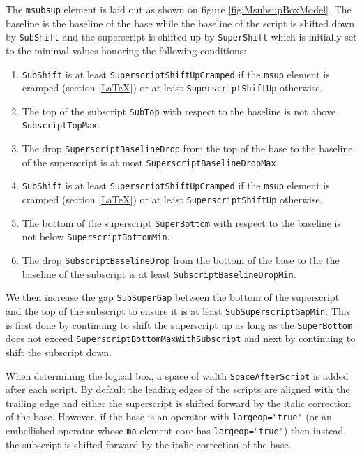 The {\tt msubsup} element is laid out as shown on figure
\ref{fig:MsubsupBoxModel}.
The baseline is the baseline of the base while the baseline of the script is
shifted down by {\tt SubShift} and the superscript is shifted up by
{\tt SuperShift} which is initially set to the minimal values honoring the
following conditions:
\begin{enumerate}
\item {\tt SubShift} is at least
  {\tt SuperscriptShiftUpCramped} if the {\tt msup} element is
  cramped (section \ref{LaTeX}) or at least
  {\tt SuperscriptShiftUp} otherwise.
\item The top of the subscript {\tt SubTop} with respect to the baseline
  is not above {\tt SubscriptTopMax}.
\item The drop {\tt SuperscriptBaselineDrop} from the top of the base to
  the baseline of the superscript is at most {\tt SuperscriptBaselineDropMax}.
\item {\tt SubShift} is at least
  {\tt SuperscriptShiftUpCramped} if the {\tt msup} element is
  cramped (section \ref{LaTeX}) or at least
  {\tt SuperscriptShiftUp} otherwise.
\item The bottom of the superscript {\tt SuperBottom} with respect to the
  baseline is not below {\tt SuperscriptBottomMin}.
\item The drop {\tt SubscriptBaselineDrop} from
  the bottom of the base to the the baseline of the subscript is at least
  {\tt SubscriptBaselineDropMin}.
\end{enumerate}

We then increase the gap {\tt SubSuperGap} between the bottom of the superscript
and the top of the subscript to ensure it is at least
{\tt SubSuperscriptGapMin}:
This is first done by continuing to shift the superscript up as long as the
{\tt SuperBottom} does not exceed
{\tt SuperscriptBottomMaxWithSubscript}
and next by continuing to shift the subscript down.

When determining
the logical box, a space of width {\tt SpaceAfterScript}
is added after
each script. By default the leading edges of the scripts are aligned with
the trailing edge and either the superscript is shifted forward by the italic
correction of the base. However, if the base is an operator with
{\tt largeop="true"} (or an embellished operator whose {\tt mo} element core
has {\tt largeop="true"}) then instead the subscript is shifted forward by the
italic correction of the base.

